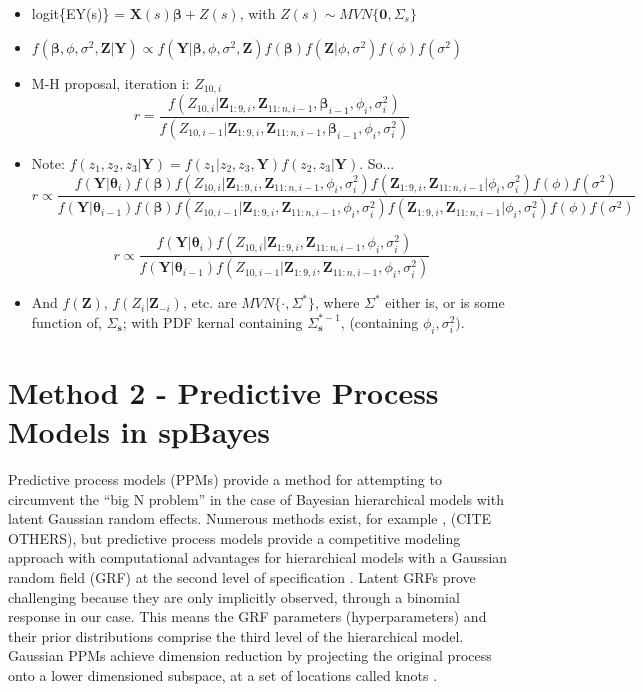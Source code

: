 \documentclass{article}
\begin{document}
\begin{itemize}
\item logit\{EY(s)\} = $\pmb{X}(s)\pmb{\beta} + Z(s)$, with $Z(s) \sim MVN\{\pmb{0}, \Sigma_{s}\}$
\item $f(\pmb{\beta}, \phi, \sigma^{2}, \pmb{Z}|\pmb{Y}) \propto f(\pmb{Y}|\pmb{\beta}, \phi, \sigma^{2}, \pmb{Z})f(\pmb{\beta})f(\pmb{Z}|\phi, \sigma^{2})f(\phi)f(\sigma^{2})$
\item M-H proposal, iteration i: $Z_{10,i}$
$$ r = \frac{ f(Z_{10,i}|\pmb{Z}_{1:9,i},\pmb{Z}_{11:n,i-1}, \pmb{\beta}_{i-1}, \phi_{i}, \sigma^{2}_{i})}{f(Z_{10,i-1}|\pmb{Z}_{1:9,i},\pmb{Z}_{11:n,i-1}, \pmb{\beta}_{i-1}, \phi_{i}, \sigma^{2}_{i})} $$
 
\item Note: $f(z_{1}, z_{2}, z_{3}|\pmb{Y}) = f(z_{1}|z_{2},z_{3},\pmb{Y})f(z_{2},z_{3}|\pmb{Y})$. So... $$r \propto \frac{f(\pmb{Y}|\pmb{\theta}_{i})f(\pmb{\beta})f(Z_{10,i}|\pmb{Z}_{1:9,i},\pmb{Z}_{11:n,i-1}, \phi_{i}, \sigma^{2}_{i})f(\pmb{Z}_{1:9,i},\pmb{Z}_{11:n,i-1}|\phi_{i}, \sigma^{2}_{i})f(\phi)f(\sigma^{2})} {f(\pmb{Y}|\pmb{\theta}_{i-1})f(\pmb{\beta})f(Z_{10,i-1}|\pmb{Z}_{1:9,i},\pmb{Z}_{11:n,i-1}, \phi_{i}, \sigma^{2}_{i})f(\pmb{Z}_{1:9,i},\pmb{Z}_{11:n,i-1}|\phi_{i}, \sigma^{2}_{i})f(\phi)f(\sigma^{2})}$$

$$ r \propto \frac{f(\pmb{Y}|\pmb{\theta}_{i})f(Z_{10,i}|\pmb{Z}_{1:9,i},\pmb{Z}_{11:n,i-1}, \phi_{i}, \sigma^{2}_{i})}
{f(\pmb{Y}|\pmb{\theta}_{i-1})f(Z_{10,i-1}|\pmb{Z}_{1:9,i},\pmb{Z}_{11:n,i-1}, \phi_{i}, \sigma^{2}_{i})} $$

\item And $f(\pmb{Z})$, $f(Z_{i}|\pmb{Z}_{-i})$, etc. are $MVN\{\cdot,\Sigma^{*}\}$, where $\Sigma^{*}$ either is, or is some function of, $\Sigma_{\pmb{s}}$; with PDF kernal containing $\Sigma_{\pmb{s}}^{*-1}$, (containing $\phi_{i}, \sigma^{2}_{i})$.

\end{itemize}

\section{Method 2 - Predictive Process Models in spBayes} %

Predictive process models (PPMs) provide a method for attempting to circumvent the ``big N problem'' in the case of Bayesian hierarchical models with latent Gaussian random effects. Numerous methods exist, for example \citep{Cressie2008}, (CITE OTHERS), but predictive process models provide a competitive modeling approach with computational advantages for hierarchical models with a Gaussian random field (GRF) at the second level of specification \citep{Banerjee2008}. Latent GRFs prove challenging because they are only implicitly observed, through a binomial response in our case. This means the GRF parameters (hyperparameters) and their prior distributions comprise the third level of the hierarchical model. Gaussian PPMs achieve dimension reduction by projecting the original process onto a lower dimensioned subspace, at a set of locations called knots \citep{Banerjee2008}. 
\end{document}
